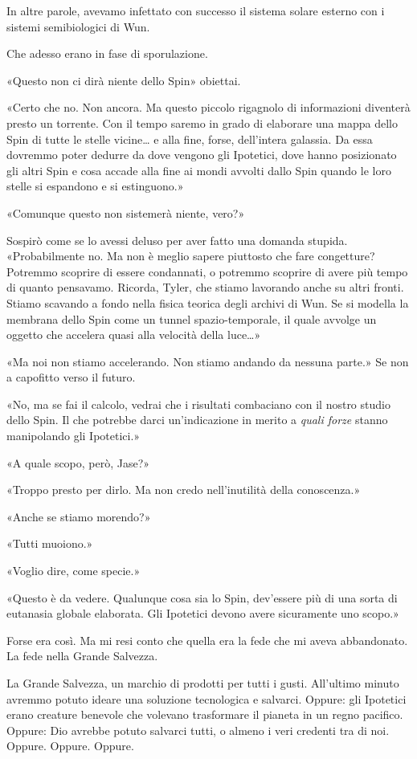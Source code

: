In altre parole, avevamo infettato con successo il sistema solare
esterno con i sistemi semibiologici di Wun.

Che adesso erano in fase di sporulazione.

«Questo non ci dirà niente dello Spin» obiettai.

«Certo che no. Non ancora. Ma questo piccolo rigagnolo di informazioni
diventerà presto un torrente. Con il tempo saremo in grado di elaborare
una mappa dello Spin di tutte le stelle vicine\ldots{} e alla fine,
forse, dell'intera galassia. Da essa dovremmo poter dedurre da dove
vengono gli Ipotetici, dove hanno posizionato gli altri Spin e cosa
accade alla fine ai mondi avvolti dallo Spin quando le loro stelle si
espandono e si estinguono.»

«Comunque questo non sistemerà niente, vero?»

Sospirò come se lo avessi deluso per aver fatto una domanda stupida.
«Probabilmente no. Ma non è meglio sapere piuttosto che fare congetture?
Potremmo scoprire di essere condannati, o potremmo scoprire di avere più
tempo di quanto pensavamo. Ricorda, Tyler, che stiamo lavorando anche su
altri fronti. Stiamo scavando a fondo nella fisica teorica degli archivi
di Wun. Se si modella la membrana dello Spin come un tunnel
spazio-temporale, il quale avvolge un oggetto che accelera quasi alla
velocità della luce\ldots»

«Ma noi non stiamo accelerando. Non stiamo andando da nessuna parte.» Se
non a capofitto verso il futuro.

«No, ma se fai il calcolo, vedrai che i risultati combaciano con il
nostro studio dello Spin. Il che potrebbe darci un'indicazione in merito
a \emph{quali forze} stanno manipolando gli Ipotetici.»

«A quale scopo, però, Jase?»

«Troppo presto per dirlo. Ma non credo nell'inutilità della conoscenza.»

«Anche se stiamo morendo?»

«Tutti muoiono.»

«Voglio dire, come specie.»

«Questo è da vedere. Qualunque cosa sia lo Spin, dev'essere più di una
sorta di eutanasia globale elaborata. Gli Ipotetici devono avere
sicuramente uno scopo.»

Forse era così. Ma mi resi conto che quella era la fede che mi aveva
abbandonato. La fede nella Grande Salvezza.

La Grande Salvezza, un marchio di prodotti per tutti i gusti. All'ultimo
minuto avremmo potuto ideare una soluzione tecnologica e salvarci.
Oppure: gli Ipotetici erano creature benevole che volevano trasformare
il pianeta in un regno pacifico. Oppure: Dio avrebbe potuto salvarci
tutti, o almeno i veri credenti tra di noi. Oppure. Oppure. Oppure.

